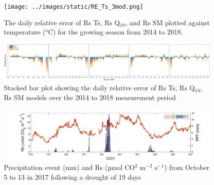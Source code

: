 \documentclass[]{elsarticle} %
\makeatletter
\def\maxwidth{\ifdim\Gin@nat@width>\linewidth\linewidth
\else\Gin@nat@width\fi}
\let\Oldincludegraphics\includegraphics
\renewcommand{\includegraphics}[1]{\Oldincludegraphics[width=\maxwidth]{#1}}
\makeatother
\begin{document}
\begin{figure}
\centering
\texttt{[image: ../images/static/RE\_Ts\_3mod.png]}
\caption{The daily relative error of Rs Ts, Rs Q\(_1\)\(_0\), and Rs SM
plotted against temperature (\(^o\)C) for the growing season from 2014
to 2018. \label{fig:tempRE}}
\end{figure}

\clearpage
\begin{landscape}

\begin{figure}
\centering
\includegraphics{../images/static/barOut.png}
\caption{Stacked bar plot showing the daily relative error of Rs Ts, Rs
Q\(_1\)\(_0\), Rs SM models over the 2014 to 2018 measurement period
\label{fig:barOut}}
\end{figure}

\begin{figure}
\centering
\includegraphics{../images/static/droughtEvent.png}
\caption{Precipitation event (mm) and Rs (µmol CO\(^2\) m\(^-\)\(^2\)
s\(^-\)\(^1\)) from October 5 to 13 in 2017 following a drought of 19
days \label{fig:droughtEvent}}
\end{figure}

\end{landscape}
\end{document}
